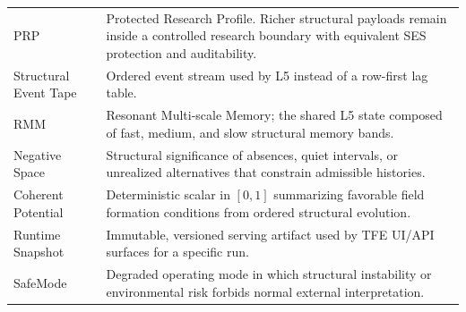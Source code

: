 \documentclass[11pt]{report}
\begin{document}
\begin{longtable}{p{}p{}}
PRP & Protected Research Profile. Richer structural payloads remain inside a controlled research boundary with equivalent SES protection and auditability. \\
Structural Event Tape & Ordered event stream used by L5 instead of a row-first lag table. \\
RMM & Resonant Multi-scale Memory; the shared L5 state composed of fast, medium, and slow structural memory bands. \\
Negative Space & Structural significance of absences, quiet intervals, or unrealized alternatives that constrain admissible histories. \\
Coherent Potential & Deterministic scalar in $[0,1]$ summarizing favorable field formation conditions from ordered structural evolution. \\
Runtime Snapshot & Immutable, versioned serving artifact used by TFE UI/API surfaces for a specific run. \\
SafeMode & Degraded operating mode in which structural instability or environmental risk forbids normal external interpretation. \\
\bottomrule
\end{longtable}
\end{document}
